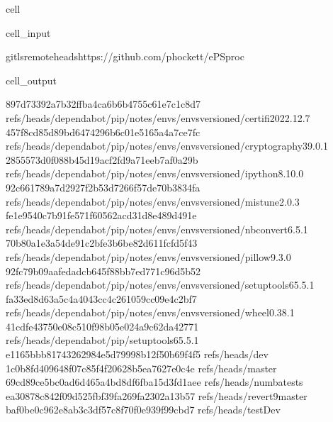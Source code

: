 \documentclass[letterpaper,table,10pt,english]{jupyterBook}
\begin{document}
\begin{sphinxuseclass}{cell}\begin{sphinxVerbatimInput}

\begin{sphinxuseclass}{cell_input}
\begin{sphinxVerbatim}[commandchars=\\\{\}]
gitls\PYGZhy{}remote\PYGZhy{}\PYGZhy{}headshttps://github.com/phockett/ePSproc
\end{sphinxVerbatim}

\end{sphinxuseclass}\end{sphinxVerbatimInput}
\begin{sphinxVerbatimOutput}

\begin{sphinxuseclass}{cell_output}
\begin{sphinxVerbatim}[commandchars=\\\{\}]
897d73392a7b32ffba4ca6b6b4755c61e7c1c8d7	refs/heads/dependabot/pip/notes/envs/envs\PYGZhy{}versioned/certifi\PYGZhy{}2022.12.7
457f8cd85d89bd6474296b6c01e5165a4a7ce7fc	refs/heads/dependabot/pip/notes/envs/envs\PYGZhy{}versioned/cryptography\PYGZhy{}39.0.1
2855573d0f088b45d19acf2fd9a71eeb7af0a29b	refs/heads/dependabot/pip/notes/envs/envs\PYGZhy{}versioned/ipython\PYGZhy{}8.10.0
92c661789a7d2927f2b53d7266f57de70b3834fa	refs/heads/dependabot/pip/notes/envs/envs\PYGZhy{}versioned/mistune\PYGZhy{}2.0.3
fe1e9540c7b91fe571f60562acd31d8e489d491e	refs/heads/dependabot/pip/notes/envs/envs\PYGZhy{}versioned/nbconvert\PYGZhy{}6.5.1
70b80a1e3a54de91c2bfe3b6be82d611fcfd5f43	refs/heads/dependabot/pip/notes/envs/envs\PYGZhy{}versioned/pillow\PYGZhy{}9.3.0
92fc79b09aafedadcb645f88bb7ed771c96d5b52	refs/heads/dependabot/pip/notes/envs/envs\PYGZhy{}versioned/setuptools\PYGZhy{}65.5.1
fa33ed8d63a5c4a4043cc4c261059cc09e4c2bf7	refs/heads/dependabot/pip/notes/envs/envs\PYGZhy{}versioned/wheel\PYGZhy{}0.38.1
41cdfe43750e08c510f98b05e024a9c62da42771	refs/heads/dependabot/pip/setuptools\PYGZhy{}65.5.1
e1165bbb81743262984e5d79998b12f50b69f4f5	refs/heads/dev
1c0b8fd409648f07c85f4f20628b5ea7627e0c4e	refs/heads/master
69cd89ce5bc0ad6d465a4bd8df6fba15d3fd1aee	refs/heads/numba\PYGZhy{}tests
ea30878c842f09d525fbf39fa269fa2302a13b57	refs/heads/revert\PYGZhy{}9\PYGZhy{}master
baf0be0c962e8ab3c3df57c8f70f0e939f99cbd7	refs/heads/testDev
\end{sphinxVerbatim}

\end{sphinxuseclass}\end{sphinxVerbatimOutput}

\end{sphinxuseclass}
\end{document}
